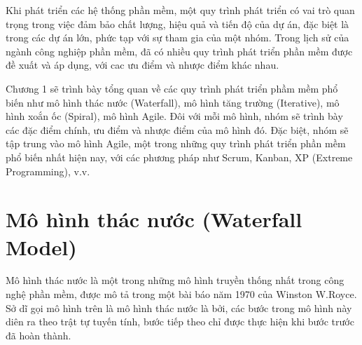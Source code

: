 \documentclass[../DoAn.tex]{subfiles}
\begin{document}
Khi phát triển các hệ thống phần mềm, một quy trình phát triển có vai trò quan trọng trong việc đảm bảo chất lượng, hiệu quả và tiến độ của dự án, đặc biệt là trong các dự án lớn, phức tạp với sự tham gia của một nhóm. Trong lịch sử của ngành công nghiệp phần mềm, đã có nhiều quy trình phát triển phần mềm được đề xuất và áp dụng, với cac ưu điểm và nhược điểm khác nhau.

Chương 1 sẽ trình bày tổng quan về các quy trình phát triển phầm mềm phổ biến như mô hình thác nước (Waterfall), mô hình tăng trường (Iterative), mô hình xoắn ốc (Spiral), mô hình Agile. Đôi với mỗi mô hình, nhóm sẽ trình bày các đặc điểm chính, ưu điểm và nhược điểm của mô hình đó. Đặc biệt, nhóm sẽ tập trung vào mô hình Agile, một trong những quy trình phát triển phần mềm phổ biến nhất hiện nay, với các phương pháp như Scrum, Kanban, XP (Extreme Programming), v.v.

\section{Mô hình thác nước (Waterfall Model)}

Mô hình thác nước là một trong những mô hình truyền thống nhất trong công nghệ phần mềm, được mô tả trong một bài báo năm 1970 của Winston W.Royce. Sở dĩ gọi mô hình trên là mô hình thác nước là bởi, các bước trong mô hình này diên ra theo trật tự tuyến tính, bước tiếp theo chỉ được thực hiện khi bước trước đã hoàn thành.
\end{document}

